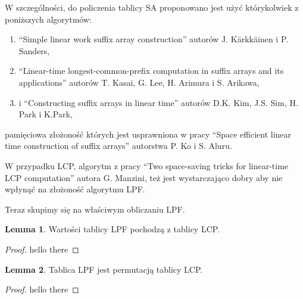 \documentclass[a4paper,12pt]{article}
\theoremstyle{definition}
\newtheorem{lemma}{Lemma}[section]
\begin{document}
\pagebreak

W szczególności, do policzenia tablicy SA proponowano jest użyć którykolwiek z poniższych algorytmów:
\begin{enumerate}
\item ``Simple linear work suffix array construction'' autorów J. Kärkkäinen i P. Sanders,
\item ``Linear-time longest-common-prefix computation in suffix arrays and its applications'' autorów T. Kasai, G. Lee, H. Arimura i S. Arikawa,
\item i ``Constructing suffix arrays in linear time'' autorów D.K. Kim, J.S. Sim, H. Park i K.Park,
\end{enumerate}
pamięciowa złożoność których jest usprawniona w pracy ``Space efficient linear time construction of suffix arrays'' autorstwa P. Ko i S. Aluru.

W przypadku LCP, algorytm z pracy ``Two space-saving tricks for linear-time LCP computation'' autora G. Manzini,
też jest wystarczająco dobry aby nie wpłynąć na złożoność algorytmu LPF.

Teraz skupimy się na właściwym obliczaniu LPF.

\begin{lemma}

Wartości tablicy LPF pochodzą z tablicy LCP.

\begin{proof}

hello there

\end{proof}
\end{lemma}

\begin{lemma}

Tablica LPF jest permutacją tablicy LCP.

\begin{proof}

hello there

\end{proof}
\end{lemma}
\end{document}
